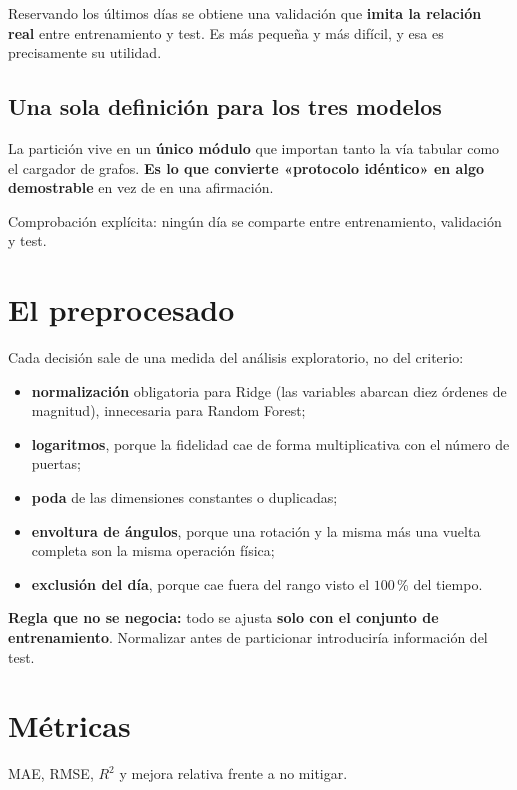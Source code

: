 Reservando los últimos días se obtiene una validación que \textbf{imita la relación real}
entre entrenamiento y test. Es más pequeña y más difícil, y esa es precisamente su utilidad.

\subsection{Una sola definición para los tres modelos}
La partición vive en un \textbf{único módulo} que importan tanto la vía tabular como el
cargador de grafos. \textbf{Es lo que convierte «protocolo idéntico» en algo demostrable} en
vez de en una afirmación.

Comprobación explícita: ningún día se comparte entre entrenamiento, validación y test.

\section{El preprocesado}
\label{sec:preprocesado}
Cada decisión sale de una medida del análisis exploratorio, no del criterio:
\begin{itemize}
    \item \textbf{normalización} obligatoria para Ridge (las variables abarcan diez órdenes de
          magnitud), innecesaria para Random Forest;
    \item \textbf{logaritmos}, porque la fidelidad cae de forma multiplicativa con el número
          de puertas;
    \item \textbf{poda} de las dimensiones constantes o duplicadas;
    \item \textbf{envoltura de ángulos}, porque una rotación y la misma más una vuelta
          completa son la misma operación física;
    \item \textbf{exclusión del día}, porque cae fuera del rango visto el $100$\,\% del tiempo.
\end{itemize}

\textbf{Regla que no se negocia:} todo se ajusta \textbf{solo con el conjunto de
entrenamiento}. Normalizar antes de particionar introduciría información del test.

\section{Métricas}
\label{sec:metricas}
MAE, RMSE, $R^2$ y mejora relativa frente a no mitigar.

